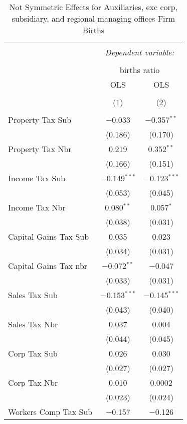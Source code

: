 
\begin{table}[!htbp] \centering 
  \caption{Not Symmetric Effects for  Auxiliaries, exc corp, subsidiary, and regional managing offices Firm Births} 
  \label{95noequality} 
\footnotesize 
\begin{tabular}{@{\extracolsep{5pt}}lcc} 
\\[-1.8ex]\hline 
\hline \\[-1.8ex] 
 & \multicolumn{2}{c}{\textit{Dependent variable:}} \\ 
\cline{2-3} 
\\[-1.8ex] & \multicolumn{2}{c}{births ratio} \\ 
 & OLS & OLS \\ 
\\[-1.8ex] & (1) & (2)\\ 
\hline \\[-1.8ex] 
 Property Tax Sub & $-$0.033 & $-$0.357$^{**}$ \\ 
  & (0.186) & (0.170) \\ 
  Property Tax Nbr & 0.219 & 0.352$^{**}$ \\ 
  & (0.166) & (0.151) \\ 
  Income Tax Sub & $-$0.149$^{***}$ & $-$0.123$^{***}$ \\ 
  & (0.053) & (0.045) \\ 
  Income Tax Nbr & 0.080$^{**}$ & 0.057$^{*}$ \\ 
  & (0.038) & (0.031) \\ 
  Capital Gains Tax Sub & 0.035 & 0.023 \\ 
  & (0.034) & (0.031) \\ 
  Capital Gains Tax nbr & $-$0.072$^{**}$ & $-$0.047 \\ 
  & (0.033) & (0.031) \\ 
  Sales Tax Sub & $-$0.153$^{***}$ & $-$0.145$^{***}$ \\ 
  & (0.043) & (0.040) \\ 
  Sales Tax Nbr & 0.037 & 0.004 \\ 
  & (0.044) & (0.045) \\ 
  Corp Tax Sub & 0.026 & 0.030 \\ 
  & (0.027) & (0.027) \\ 
  Corp Tax Nbr & 0.010 & 0.0002 \\ 
  & (0.023) & (0.024) \\ 
  Workers Comp Tax Sub & $-$0.157 & $-$0.126 \\ 

\end{tabular}
\end{table}
